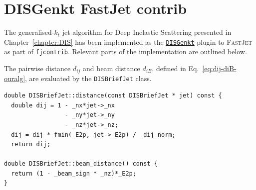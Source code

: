 \chapter{DISGenkt FastJet contrib}
\label{ap:DIS-fastjet}

The generalised-$k_t$ jet algorithm for Deep Inelastic Scattering presented in
Chapter~\ref{chapter:DIS} has been implemented as the
\href{https://repo.hepforge.org/source/fastjetsvn/browse/contrib/contribs/DISGenkt}{\texttt{DISGenkt}}
plugin to \textsc{FastJet} as part of \texttt{fjcontrib}. Relevant parts of the implementation are outlined below.

The pairwise distance $d_{ij}$ and beam distance $d_{iB}$,
defined in Eq.~\eqref{eq:dij-diB-ouralg}, are evaluated by the
\texttt{DISBriefJet} class. 
\begin{lstlisting}[caption={Implementation of the pairwise distance and 
beam distance. }]
double DISBriefJet::distance(const DISBriefJet * jet) const {
  double dij = 1 - _nx*jet->_nx
                 - _ny*jet->_ny
                 - _nz*jet->_nz;
  dij = dij * fmin(_E2p, jet->_E2p) / _dij_norm;
  return dij;
  
double DISBriefJet::beam_distance() const {
  return (1 - _beam_sign * _nz)*_E2p;  
}
\end{lstlisting}

